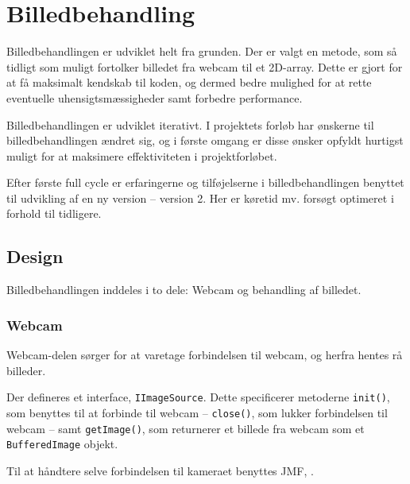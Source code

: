 \chapter{Billedbehandling}\label{cha:ip}
Billedbehandlingen er udviklet helt fra grunden. Der er valgt en metode, som så tidligt som muligt fortolker billedet fra webcam til et 2D-array. Dette er gjort for at få maksimalt kendskab til koden, og dermed bedre mulighed for at rette eventuelle uhensigtsmæssigheder samt forbedre performance.

Billedbehandlingen er udviklet iterativt. I projektets forløb har ønskerne til billedbehandlingen ændret sig, og i første omgang er disse ønsker opfyldt hurtigst muligt for at maksimere effektiviteten i projektforløbet.

Efter første full cycle er erfaringerne og tilføjelserne i billedbehandlingen benyttet til udvikling af en ny version -- version 2. Her er køretid mv. forsøgt optimeret i forhold til tidligere.

\section{Design}
Billedbehandlingen inddeles i to dele: Webcam og behandling af billedet.

\subsection{Webcam}
Webcam-delen sørger for at varetage forbindelsen til webcam, og herfra hentes rå billeder.

Der defineres et interface, \texttt{IImageSource}. Dette specificerer metoderne \texttt{init()}, som benyttes til at forbinde til webcam -- \texttt{close()}, som lukker forbindelsen til webcam -- samt \texttt{getImage()}, som returnerer et billede fra webcam som et \texttt{BufferedImage} objekt.

Til at håndtere selve forbindelsen til kameraet benyttes JMF, \citet{jmf}.

